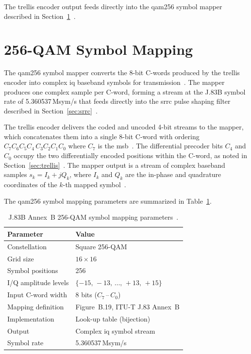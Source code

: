 The trellis encoder output feeds directly into the \ac{qam256}
symbol mapper described in
Section~\ref{sec:qam256}~\cite{ITU_J83}.


\section{256-QAM Symbol Mapping}
\label{sec:qam256}

The \ac{qam256} symbol mapper converts the 8-bit C-words
produced by the trellis encoder into complex \ac{iq} baseband
symbols for transmission~\cite{ITU_J83}.
The mapper produces one complex sample per C-word, forming a
stream at the J.83B symbol rate of 5.360537\,Msym/s that feeds
directly into the \ac{srrc} pulse shaping filter described in
Section~\ref{sec:srrc}~\cite{ITU_J83}.

The trellis encoder delivers the coded and uncoded 4-bit streams
to the mapper, which concatenates them into a single 8-bit C-word
with ordering $C_7 C_6 C_5 C_4\,C_3 C_2 C_1 C_0$ where $C_7$
is the \ac{msb}~\cite{ITU_J83}.
The differential precoder bits $C_4$ and $C_0$ occupy the two
differentially encoded positions within the C-word, as noted in
Section~\ref{sec:trellis}~\cite{ITU_J83}.
The mapper output is a stream of complex baseband samples
$s_k = I_k + j Q_k$, where $I_k$ and $Q_k$ are the in-phase
and quadrature coordinates of the $k$-th mapped
symbol~\cite{ITU_J83}.


The \ac{qam256} symbol mapping parameters are summarized in
Table~\ref{tab:qam256_params}.

\begin{table}[htbp]
  \caption{J.83B Annex~B 256-QAM symbol mapping
           parameters~\cite{ITU_J83}.}
  \label{tab:qam256_params}
  \centering
  \begin{tabular}{ll}
    \hline
    Parameter              & Value \\
    \hline
    Constellation          & Square 256-QAM \\
    Grid size              & $16 \times 16$ \\
    Symbol positions       & 256 \\
    I/Q amplitude levels   & $\{-15,\,-13,\,\ldots,\,+13,\,+15\}$ \\
    Input C-word width     & 8 bits ($C_7$\,--\,$C_0$) \\
    Mapping definition     & Figure~B.19, ITU-T J.83 Annex~B \\
    Implementation         & Look-up table (bijection) \\
    Output                 & Complex \ac{iq} symbol stream \\
    Symbol rate            & 5.360537\,Msym/s \\
    \hline
  \end{tabular}
\end{table}


